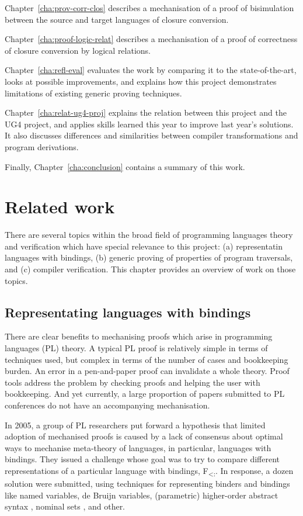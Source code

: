 \documentclass[bsc,frontabs,oneside,singlespacing,parskip,deptreport]{infthesis}
\theoremstyle{definition}
\theoremstyle{lemma}
\begin{document}
Chapter~\ref{cha:prov-corr-clos} describes a mechanisation of a proof
of bisimulation between the source and target languages of closure
conversion.

Chapter~\ref{cha:proof-logic-relat} describes a mechanisation of a
proof of correctness of closure conversion by logical relations.

Chapter~\ref{cha:refl-eval} evaluates the work by comparing it to the
state-of-the-art, looks at possible improvements, and explains how
this project demonstrates limitations of existing generic proving
techniques.

Chapter~\ref{cha:relat-ug4-proj} explains the relation between this
project and the UG4 project, and applies skills learned this year to
improve last year's solutions. It also discusses differences and
similarities between compiler transformations and program
derivations.

Finally, Chapter~\ref{cha:conclusion} contains a summary of this
work. 

\chapter{Related work}
\label{cha:related-work}

There are several topics within the broad field of programming
languages theory and verification which have special relevance to this
project: (a) representatin languages with bindings, (b) generic
proving of properties of program traversals, and (c) compiler
verification. This chapter provides an overview of work on those
topics.

\section{Representating languages with bindings}
\label{sec:repr-lang-with}

There are clear benefits to mechanising proofs which arise in
programming languages (PL) theory. A typical PL proof is relatively
simple in terms of techniques used, but complex in terms of the number
of cases and bookkeeping burden. An error in a pen-and-paper proof can
invalidate a whole theory. Proof tools address the problem by checking
proofs and helping the user with bookkeeping. And yet currently, a
large proportion of papers submitted to PL conferences do not have an
accompanying mechanisation.

In 2005, a group of PL researchers put forward a hypothesis that
limited adoption of mechanised proofs is caused by a lack of consensus
about optimal ways to mechanise meta-theory of languages, in
particular, languages with bindings. They issued a challenge
\cite{poplmarkreloaded} whose goal was to try to compare different
representations of a particular language with bindings,
F\textsubscript{<:}. In response, a dozen solution were submitted,
using techniques for representing binders and bindings like named
variables, de Bruijn variables, (parametric) higher-order abstract
syntax \cite{DBLP:conf/pldi/PfenningE88}
\cite{DBLP:conf/icfp/Chlipala08}, nominal sets
\cite{pitts2013nominal}, and other.
\end{document}
